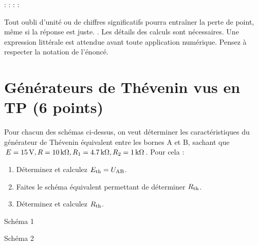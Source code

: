\documentclass[10pt,a4paper]{article}
\begin{document}
\noindent {} : \hfill {} : \hfill {} : \hfill {} :
\hspace*{3em}\bigbreak

Tout oubli d’unité ou de chiffres significatifs pourra entraîner la perte de
point, même si la réponse est juste. . Les détails des calculs sont nécessaires. Une expression littérale
est attendue avant toute application numérique. Pensez à respecter la notation
de l'énoncé.

\section{Générateurs de Thévenin vus en TP (6 points)}
\begin{figure}[htbp!]
    \vspace*{-20pt}
    \centering
    \hspace{3cm}
\end{figure}

Pour chacun des schémas ci-dessus, on veut déterminer les caractéristiques du
générateur de Thévenin équivalent entre les bornes A et B, sachant que $E =
\SI{15}{V}, R = \SI{10}{k\Omega}, R_1 = \SI{4.7}{k\Omega}, R_2 = \SI{1}{k\Omega}$. Pour cela
:

\begin{enumerate}[label=\color{brandeisblue}\arabic*)]
    \item Déterminez et calculez $E _{\text{th}} = U _{\text{AB}}$.
    \item Faites le schéma équivalent permettant de déterminer $R _{\text{th}}$.
    \item Déterminez et calculez $R _{\text{th}}$.
\end{enumerate}

\begin{minipage}[c]{0.49999\textwidth}
    \begin{center}
        Schéma 1
    \end{center}
    \raggedleft\vrule height 14cm
\end{minipage}%
\begin{minipage}[c]{0.49999\textwidth}
    \begin{center}
        Schéma 2
    \end{center}
    \vspace{14cm}
\end{minipage}
\end{document}

